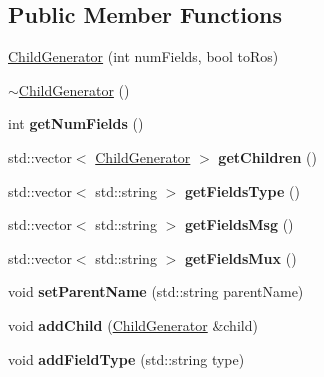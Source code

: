 \subsection*{Public Member Functions}
\begin{DoxyCompactItemize}
\item 
\hyperlink{classChildGenerator_ae32dcca9e5fdf68591c0234ac5892efb}{Child\-Generator} (int num\-Fields, bool to\-Ros)
\item 
\hyperlink{classChildGenerator_ae02e5d64e580bb25b590ca7558efaa0a}{$\sim$\-Child\-Generator} ()
\item 
\hypertarget{classChildGenerator_ae6581386da55d6cd9792fd0eb0715442}{int {\bfseries get\-Num\-Fields} ()}\label{classChildGenerator_ae6581386da55d6cd9792fd0eb0715442}

\item 
\hypertarget{classChildGenerator_a92c28e7e0312810f1db1302737c3a4f6}{std\-::vector$<$ \hyperlink{classChildGenerator}{Child\-Generator} $>$ {\bfseries get\-Children} ()}\label{classChildGenerator_a92c28e7e0312810f1db1302737c3a4f6}

\item 
\hypertarget{classChildGenerator_a5ec4534067ff985b052273f69db8b4af}{std\-::vector$<$ std\-::string $>$ {\bfseries get\-Fields\-Type} ()}\label{classChildGenerator_a5ec4534067ff985b052273f69db8b4af}

\item 
\hypertarget{classChildGenerator_aabc717278731ef281f8015b94a529786}{std\-::vector$<$ std\-::string $>$ {\bfseries get\-Fields\-Msg} ()}\label{classChildGenerator_aabc717278731ef281f8015b94a529786}

\item 
\hypertarget{classChildGenerator_a3457cb5b97dfea562dfa0dd64c5dcbeb}{std\-::vector$<$ std\-::string $>$ {\bfseries get\-Fields\-Mux} ()}\label{classChildGenerator_a3457cb5b97dfea562dfa0dd64c5dcbeb}

\item 
\hypertarget{classChildGenerator_af5f270a920e3ca8b67d6a055552fd9f8}{void {\bfseries set\-Parent\-Name} (std\-::string parent\-Name)}\label{classChildGenerator_af5f270a920e3ca8b67d6a055552fd9f8}

\item 
\hypertarget{classChildGenerator_a89df978421779b69ac49ce1ca005dd07}{void {\bfseries add\-Child} (\hyperlink{classChildGenerator}{Child\-Generator} \&child)}\label{classChildGenerator_a89df978421779b69ac49ce1ca005dd07}

\item 
\hypertarget{classChildGenerator_aa651c4d61b61b4e4db9061256996026c}{void {\bfseries add\-Field\-Type} (std\-::string type)}\label{classChildGenerator_aa651c4d61b61b4e4db9061256996026c}


\end{DoxyCompactItemize}
